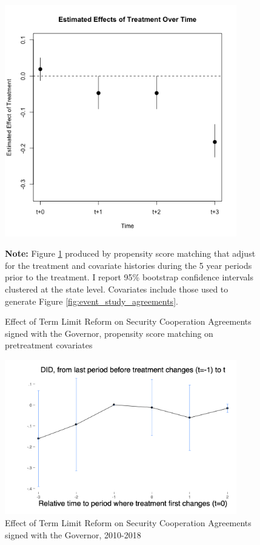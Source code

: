 \documentclass[12pt]{amsart}
\numberwithin{equation}{section}
\theoremstyle{definition}
\theoremstyle{definition}
\theoremstyle{definition}
\begin{document}
\begin{appendix}
\begin{figure}[H] 
\centering
 \caption{Effect of Term Limit Reform on Security Cooperation Agreements signed with the Governor, propensity score matching on pretreatment covariates}
 \label{fig:matching}
\includegraphics[width=0.9\textwidth]{../Figures/acuerdo_gobestatal.png}
       \captionsetup{justification=centering}
       
        
 \textbf{Note:} Figure \ref{fig:matching} produced by propensity score matching that adjust for the treatment and covariate histories during the 5 year periods prior to the treatment. I report 95\% bootstrap confidence intervals clustered at the state level. Covariates include those used to generate Figure \ref{fig:event_study_agreements}. 

\end{figure}   
 
 \clearpage 
\begin{figure}[H] 
\centering
 \caption{Effect of Term Limit Reform on Security Cooperation Agreements signed with the Governor, 2010-2018}
 \label{fig:chaisemarting_agreements}
\includegraphics[width=0.9\textwidth]{../Figures/chaisemartin_acuerdo_estcom.png}
       \captionsetup{justification=centering}
\end{figure}   


\end{appendix}
\end{document}

